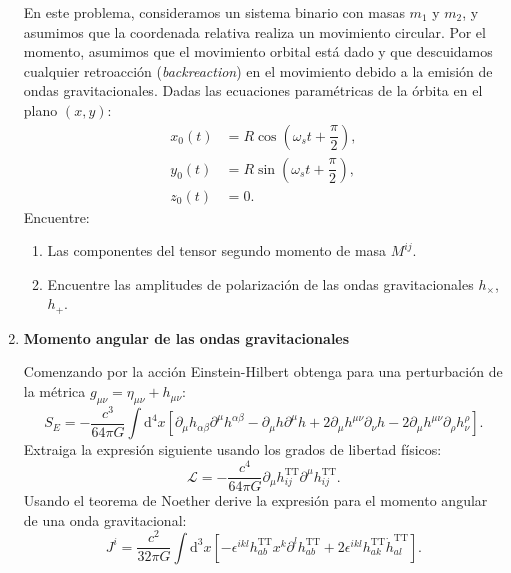 \documentclass[../main]{subfiles}
\begin{document}
\begin{adjustwidth}{0pt}{-100pt}
\begin{enumerate}
    En este problema, consideramos un sistema binario con masas $m_1$ y $m_2$, y asumimos que la coordenada relativa realiza un movimiento circular. Por el momento, asumimos que el movimiento orbital está dado y que descuidamos cualquier retroacción (\textit{backreaction}) en el movimiento debido a la emisión de ondas gravitacionales. Dadas las ecuaciones paramétricas de la órbita en el plano $(x, y)$:
    \begin{equation}
        \begin{split}
            x_0(t)&=R \cos\left(\omega_s t+\dfrac{\pi}{2}\right),\\
            y_0(t)&=R \sin\left(\omega_s t+\dfrac{\pi}{2}\right),\\
            z_0(t)&=0.
        \end{split}
    \end{equation}
    Encuentre:
    \begin{enumerate}[label=(\alph*)]
        \item Las componentes del tensor segundo momento de masa $M^{ij}$.
        \item Encuentre las amplitudes de polarización de las ondas gravitacionales $h_{\times}$, $h_{+}$.
    \end{enumerate}
    \item \textbf{Momento angular de las ondas gravitacionales}
    
    Comenzando por la acción Einstein-Hilbert obtenga para una perturbación de la métrica $g_{\mu\nu}=\eta_{\mu\nu}+h_{\mu\nu}$:
    \begin{equation}
        S_E=-\dfrac{c^3}{64\pi G} \int \mathrm{d}^4 x\left[\partial_{\mu}h_{\alpha\beta}\partial^{\mu}h^{\alpha\beta}-\partial_{\mu}h \partial^{\mu}h+2\partial_{\mu}h^{\mu\nu}\partial_{\nu}h-2\partial_{\mu}h^{\mu\nu}\partial_{\rho}h^{\rho}_{\nu}\right].
    \end{equation}
    Extraiga la expresión siguiente usando los grados de libertad físicos:
    \begin{equation}
        \mathcal{L}=-\dfrac{c^4}{64\pi G}\partial_{\mu}h^{\mathrm{TT}}_{ij}\partial^{\mu}h^{\mathrm{TT}}_{ij}.
    \end{equation}
    Usando el teorema de Noether derive la expresión para el momento angular de una onda gravitacional:
    \begin{equation}
        J^{i}=\dfrac{c^2}{32\pi G}\int \mathrm{d}^3 x\left[-\epsilon^{ikl}h^{\mathrm{TT}}_{ab}x^k \partial^{l}h^{\mathrm{TT}}_{ab}+2\epsilon^{ikl}h^{\mathrm{TT}}_{ak}\dot{h}^{\mathrm{TT}}_{al}\right].
    \end{equation}
\end{enumerate}
\end{adjustwidth}
\end{document}
